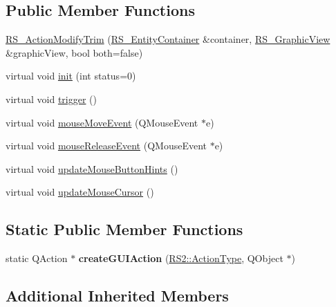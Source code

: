 \subsection*{Public Member Functions}
\begin{DoxyCompactItemize}
\item 
\hyperlink{classRS__ActionModifyTrim_a89d6c0954d3ba5fa2657b4aadf492622}{R\-S\-\_\-\-Action\-Modify\-Trim} (\hyperlink{classRS__EntityContainer}{R\-S\-\_\-\-Entity\-Container} \&container, \hyperlink{classRS__GraphicView}{R\-S\-\_\-\-Graphic\-View} \&graphic\-View, bool both=false)
\item 
virtual void \hyperlink{classRS__ActionModifyTrim_aa28e8adbe2082171f980ade9657dd0bc}{init} (int status=0)
\item 
virtual void \hyperlink{classRS__ActionModifyTrim_ae8de35eeb2994c66ddde422e81dc3df2}{trigger} ()
\item 
virtual void \hyperlink{classRS__ActionModifyTrim_ac95d857765616d6531cc3bf89a8af7c3}{mouse\-Move\-Event} (Q\-Mouse\-Event $\ast$e)
\item 
virtual void \hyperlink{classRS__ActionModifyTrim_a908f649f0ca9a7c1bfc15199ff2afd89}{mouse\-Release\-Event} (Q\-Mouse\-Event $\ast$e)
\item 
virtual void \hyperlink{classRS__ActionModifyTrim_a3293f6cd20923c4295e63676b5ca6574}{update\-Mouse\-Button\-Hints} ()
\item 
virtual void \hyperlink{classRS__ActionModifyTrim_a92c811d68a95c69c750a10db82b634db}{update\-Mouse\-Cursor} ()
\end{DoxyCompactItemize}
\subsection*{Static Public Member Functions}
\begin{DoxyCompactItemize}
\item 
\hypertarget{classRS__ActionModifyTrim_ada34964e87aeb83a4a04d9ff00df4ddb}{static Q\-Action $\ast$ {\bfseries create\-G\-U\-I\-Action} (\hyperlink{classRS2_afe3523e0bc41fd637b892321cfc4b9d7}{R\-S2\-::\-Action\-Type}, Q\-Object $\ast$)}\label{classRS__ActionModifyTrim_ada34964e87aeb83a4a04d9ff00df4ddb}

\end{DoxyCompactItemize}
\subsection*{Additional Inherited Members}


